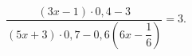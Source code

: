 \begin{ex}[type=equation]
	\begin{condition}
		$\dfrac{(3x - 1)\cdot0,4 - 3}{(5x + 3)\cdot0,7 - 0,6\left(6x -\dfrac{1}{6}\right)} = 3 .$
	\end{condition}
\end{ex}